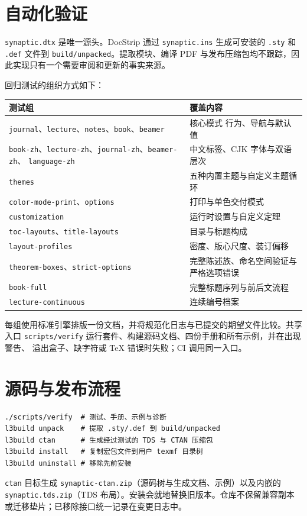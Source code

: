 \documentclass[a4paper,11pt]{scrartcl}
\begin{document}
\section{自动化验证}

\texttt{synaptic.dtx} 是唯一源头。DocStrip 通过 \texttt{synaptic.ins} 生成可安装的
\texttt{.sty} 和 \texttt{.def} 文件到 \texttt{build/unpacked}。提取模块、编译 PDF
与发布压缩包均不跟踪，因此实现只有一个需要审阅和更新的事实来源。

回归测试的组织方式如下：

{\setlength{\parindent}{0pt}\noindent\begin{tabularx}{\textwidth}{@{}l Y@{}}
  \toprule
  \textbf{测试组} & \textbf{覆盖内容} \\
  \midrule
  \texttt{journal}、\texttt{lecture}、\texttt{notes}、\texttt{book}、\texttt{beamer} & 核心模式
  行为、导航与默认值 \\
  \texttt{book-zh}、\texttt{lecture-zh}、\texttt{journal-zh}、\texttt{beamer-zh}、
  \texttt{language-zh} & 中文标签、CJK 字体与双语层次 \\
  \texttt{themes} & 五种内置主题与自定义主题循环 \\
  \texttt{color-mode-print}、\texttt{options} & 打印与单色交付模式 \\
  \texttt{customization} & 运行时设置与自定义定理 \\
  \texttt{toc-layouts}、\texttt{title-layouts} & 目录与标题构成 \\
  \texttt{layout-profiles} & 密度、版心尺度、装订偏移 \\
  \texttt{theorem-boxes}、\texttt{strict-options} & 完整陈述族、命名空间验证与严格选项错误 \\
  \texttt{book-full} & 完整标题序列与前后文流程 \\
  \texttt{lecture-continuous} & 连续编号档案 \\
  \bottomrule
\end{tabularx}}

每组使用标准引擎排版一份文档，并将规范化日志与已提交的期望文件比较。共享入口
\texttt{scripts/verify} 运行套件、构建源码文档、四份手册和所有示例，并在出现警告、
溢出盒子、缺字符或 TeX 错误时失败；CI 调用同一入口。

\section{源码与发布流程}

\begin{verbatim}
./scripts/verify  # 测试、手册、示例与诊断
l3build unpack    # 提取 .sty/.def 到 build/unpacked
l3build ctan      # 生成经过测试的 TDS 与 CTAN 压缩包
l3build install   # 复制宏包文件到用户 texmf 目录树
l3build uninstall # 移除先前安装
\end{verbatim}

\texttt{ctan} 目标生成 \texttt{synaptic-ctan.zip}（源码树与生成文档、示例）以及内嵌的
\texttt{synaptic.tds.zip}（TDS 布局）。安装会就地替换旧版本。仓库不保留兼容副本
或迁移垫片；已移除接口统一记录在变更日志中。
\end{document}
